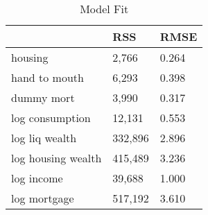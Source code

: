 \begin{table}[htbp]
\caption{\label{clabel} Model Fit}\centering\medskip
\begin{tabular}{lll} \hline \hline
 & RSS  & RMSE  \\  \hline 
housing &     2,766 &     0.264 \\  
hand to mouth &     6,293 &     0.398 \\  
dummy mort &     3,990 &     0.317 \\  
log consumption &    12,131 &     0.553 \\  
log liq wealth &   332,896 &     2.896 \\  
log housing wealth &   415,489 &     3.236 \\  
log income &    39,688 &     1.000 \\  
log mortgage &   517,192 &     3.610 \\  
\hline \hline \end{tabular}
\end{table}
